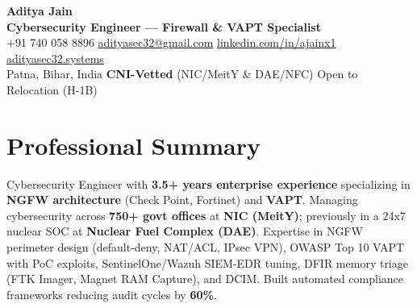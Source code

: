 \documentclass[10pt,a4paper]{article}
\begin{document}
\begin{center}
  {\Large\bfseries\color{primary} Aditya Jain} \\[2pt]
  {\small\color{accent}\textbf{Cybersecurity Engineer --- Firewall \& VAPT Specialist}} \\[3pt]
  {\footnotesize
    \;+91 740 058 8896 \quad\textbar\quad
    \;\href{mailto:adityasec32@gmail.com}{adityasec32@gmail.com} \quad\textbar\quad
    \;\href{https://linkedin.com/in/ajainx1}{linkedin.com/in/ajainx1} \quad\textbar\quad
    \;\href{https://adityasec32.systems}{adityasec32.systems}
  } \\[2pt]
  {\footnotesize {}\;Patna, Bihar, India \quad\textbar\quad \textbf{CNI-Vetted} (NIC/MeitY \& DAE/NFC) \quad\textbar\quad Open to Relocation (H-1B)}
\end{center}

\vspace{-2pt}

\section{Professional Summary}
\footnotesize
Cybersecurity Engineer with \textbf{3.5+ years enterprise experience} specializing in \textbf{NGFW architecture} (Check Point, Fortinet) and \textbf{VAPT}. Managing cybersecurity across \textbf{750+ govt offices} at \textbf{NIC (MeitY)}; previously in a 24x7 nuclear SOC at \textbf{Nuclear Fuel Complex (DAE)}. Expertise in NGFW perimeter design (default-deny, NAT/ACL, IPsec VPN), OWASP Top 10 VAPT with PoC exploits, SentinelOne/Wazuh SIEM-EDR tuning, DFIR memory triage (FTK Imager, Magnet RAM Capture), and DCIM. Built automated compliance frameworks reducing audit cycles by \textbf{60\%}.

\end{document}
